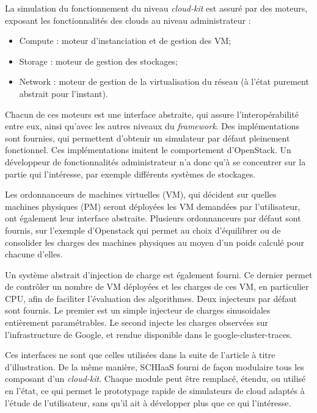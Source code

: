 \documentclass[parallelisme]{compas2017}
\begin{document}
La simulation du fonctionnement du  niveau \textit{cloud-kit} est assuré par des
moteurs, exposant les fonctionnalités des clouds au niveau administrateur :
\begin{itemize}
 \item Compute : moteur d'instanciation et de gestion des VM;
 \item Storage : moteur de gestion des stockages;
 \item Network : moteur de gestion de la virtualisation du réseau (à l'état purement abstrait pour l'instant).
\end{itemize}

Chacun de ces moteurs est une interface abstraite, qui assure l'interopérabilité
entre  eux,  ainsi  qu'avec  les   autres  niveaux  du  \textit{framework}.  Des
implémentations sont fournies, qui permettent d'obtenir un simulateur par défaut
pleinement   fonctionnel.   Ces    implémentations   imitent   le   comportement
d'OpenStack. Un développeur  de fonctionnalités administrateur n'a  donc qu'à se
concentrer sur  la partie  qui l'intéresse, par  exemple différents  systèmes de
stockages.

Les ordonnanceurs de machines virtuelles (VM), qui décident sur quelles machines
physiques  (PM)  seront  déployées  les  VM  demandées  par  l'utilisateur,  ont
également  leur interface  abstraite.  Plusieurs ordonnanceurs  par défaut  sont
fournis,  sur l'exemple  d'Openstack  qui  permet au  choix  d'équilibrer ou  de
consolider les charges  des machines physiques au moyen d'un  poids calculé pour
chacune d'elles.

Un  système abstrait  d'injection de  charge  est également  fourni. Ce  dernier
permet de  contrôler un  nombre de  VM déployées et  les charges  de ces  VM, en
particulier  CPU,   afin  de  faciliter  l'évaluation   des  algorithmes.   Deux
injecteurs  par défaut  sont  fournis. Le  premier est  un  simple injecteur  de
charges sinusoidales  entièrement paramétrables.  Le second injecte  les charges
observées  sur  l'infrastructure  de  Google,   et  rendue  disponible  dans  le
google-cluster-traces.

Ces interfaces ne sont  que celles utilisées dans la suite  de l'article à titre
d'illustration.  De la même manière, SCHIaaS  fourni de façon modulaire tous les
composant d'un \textit{cloud-kit}.  Chaque module peut être remplacé, étendu, ou
utilisé en l'état,  ce qui permet le prototypage rapide  de simulateurs de cloud
adaptés à l'étude de l'utilisateur, sans qu'il  ait à développer plus que ce qui
l'intéresse.
\end{document}
